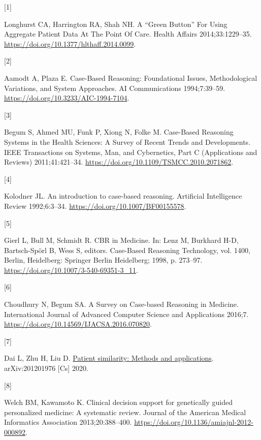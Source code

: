 \documentclass[preprint, 3p,
authoryear]{elsarticle} %
\newlength{\cslhangindent}
\newlength{\csllabelwidth}
\newlength{\cslentryspacingunit} %
\newenvironment{CSLReferences}[2] %
 {%
  \setlength{\parindent}{0pt}
  \ifodd #1
  \let\oldpar\par
  \def\par{\hangindent=\cslhangindent\oldpar}
  \fi
  \setlength{\parskip}{#2\cslentryspacingunit}
 }%
 {}
\newcommand{\CSLLeftMargin}[1]{\parbox[t]{\csllabelwidth}{#1}}
\newcommand{\CSLRightInline}[1]{\parbox[t]{\linewidth - \csllabelwidth}{#1}\break}
\begin{document}
\hypertarget{refs}{}
\begin{CSLReferences}{0}{0}
\leavevmode{}%
\CSLLeftMargin{{[}1{]} }%
\CSLRightInline{Longhurst CA, Harrington RA, Shah NH. A {``{Green
Button}''} {For Using Aggregate Patient Data At The Point Of Care}.
Health Affairs 2014;33:1229--35.
\url{https://doi.org/10.1377/hlthaff.2014.0099}.}

\leavevmode{}%
\CSLLeftMargin{{[}2{]} }%
\CSLRightInline{Aamodt A, Plaza E. Case-{Based Reasoning}: {Foundational
Issues}, {Methodological Variations}, and {System Approaches}. AI
Communications 1994;7:39--59.
\url{https://doi.org/10.3233/AIC-1994-7104}.}

\leavevmode{}%
\CSLLeftMargin{{[}3{]} }%
\CSLRightInline{Begum S, Ahmed MU, Funk P, Xiong N, Folke M. Case-{Based
Reasoning Systems} in the {Health Sciences}: {A Survey} of {Recent
Trends} and {Developments}. IEEE Transactions on Systems, Man, and
Cybernetics, Part C (Applications and Reviews) 2011;41:421--34.
\url{https://doi.org/10.1109/TSMCC.2010.2071862}.}

\leavevmode{}%
\CSLLeftMargin{{[}4{]} }%
\CSLRightInline{Kolodner JL. An introduction to case-based reasoning.
Artificial Intelligence Review 1992;6:3--34.
\url{https://doi.org/10.1007/BF00155578}.}

\leavevmode{}%
\CSLLeftMargin{{[}5{]} }%
\CSLRightInline{Gierl L, Bull M, Schmidt R. {CBR} in {Medicine}. In:
Lenz M, Burkhard H-D, Bartsch-Spörl B, Wess S, editors. Case-{Based
Reasoning Technology}, vol. 1400, {Berlin, Heidelberg}: {Springer Berlin
Heidelberg}; 1998, p. 273--97.
\url{https://doi.org/10.1007/3-540-69351-3_11}.}

\leavevmode{}%
\CSLLeftMargin{{[}6{]} }%
\CSLRightInline{Choudhury N, Begum SA. A {Survey} on {Case-based
Reasoning} in {Medicine}. International Journal of Advanced Computer
Science and Applications 2016;7.
\url{https://doi.org/10.14569/IJACSA.2016.070820}.}

\leavevmode{}%
\CSLLeftMargin{{[}7{]} }%
\CSLRightInline{Dai L, Zhu H, Liu D.
\href{http://arxiv.org/abs/2012.01976}{Patient similarity: Methods and
applications}. arXiv:201201976 {[}Cs{]} 2020.}

\leavevmode{}%
\CSLLeftMargin{{[}8{]} }%
\CSLRightInline{Welch BM, Kawamoto K. Clinical decision support for
genetically guided personalized medicine: A systematic review. Journal
of the American Medical Informatics Association 2013;20:388--400.
\url{https://doi.org/10.1136/amiajnl-2012-000892}.}


\end{CSLReferences}
\end{document}
